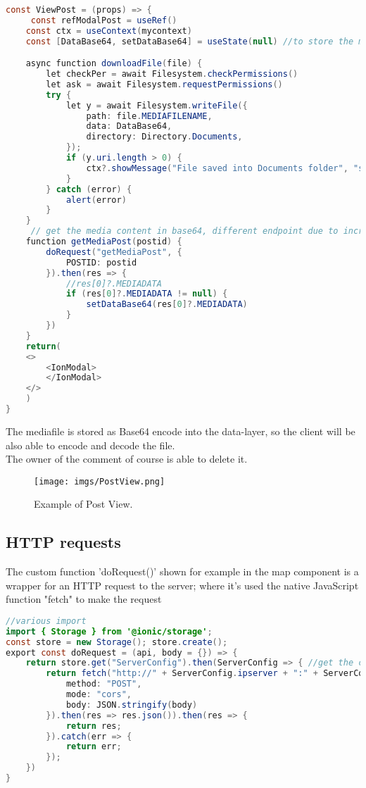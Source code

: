 \documentclass[conference]{IEEEtran}
\begin{document}
\begin{lstlisting}[language=Java, caption=ViewPost]
const ViewPost = (props) => {
     const refModalPost = useRef()
    const ctx = useContext(mycontext)
    const [DataBase64, setDataBase64] = useState(null) //to store the mediafile attached

    async function downloadFile(file) {
        let checkPer = await Filesystem.checkPermissions()
        let ask = await Filesystem.requestPermissions()
        try {
            let y = await Filesystem.writeFile({
                path: file.MEDIAFILENAME,
                data: DataBase64,
                directory: Directory.Documents,
            });
            if (y.uri.length > 0) {
                ctx?.showMessage("File saved into Documents folder", "success")
            }
        } catch (error) {
            alert(error)
        }
    }
     // get the media content in base64, different endpoint due to increment performance
    function getMediaPost(postid) {
        doRequest("getMediaPost", {
            POSTID: postid
        }).then(res => {
            //res[0]?.MEDIADATA
            if (res[0]?.MEDIADATA != null) {
                setDataBase64(res[0]?.MEDIADATA)
            }
        })
    }
    return(
    <>
        <IonModal>
        </IonModal>
    </>
    )
}
\end{lstlisting}

The mediafile is stored as Base64 encode into the data-layer, so the client will be also able to encode and decode the file.
\\
The owner of the comment of course is able to delete it.

\begin{figure}[htbp]
\begin{center}
{\texttt{[image: imgs/PostView.png]}}
\end{center}
\caption{Example of Post View.}
\label{fig}
\end{figure}


\subsection{HTTP requests}

The custom function 'doRequest()' shown for example in the map component is a wrapper for an HTTP request to the server; where it's used the native JavaScript function "fetch" to make the request
\begin{lstlisting}[language=Java, caption=Method doRequest to fetch server]
//various import 
import { Storage } from '@ionic/storage';
const store = new Storage(); store.create();
export const doRequest = (api, body = {}) => {
    return store.get("ServerConfig").then(ServerConfig => { //get the config from cache
        return fetch("http://" + ServerConfig.ipserver + ":" + ServerConfig.port + "/" + api, {
            method: "POST",
            mode: "cors",
            body: JSON.stringify(body)
        }).then(res => res.json()).then(res => {
            return res;
        }).catch(err => {
            return err;
        });
    })
}
\end{lstlisting}
\end{document}
